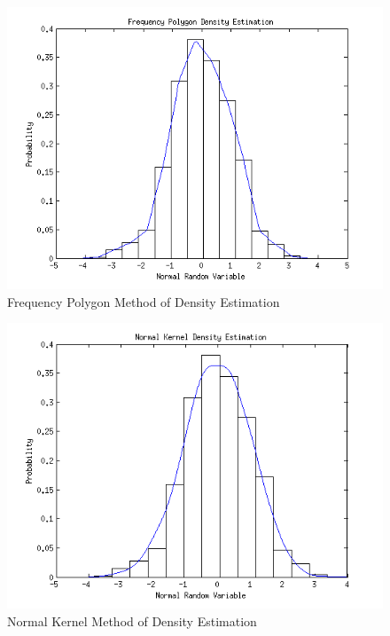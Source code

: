 \documentclass[12pt,a4paper]{article}
\begin{document}
\begin{figure}[ht!] 
\begin{center}
\includegraphics[scale=.86]{q9p4_graph2.png}
\caption{Frequency Polygon Method of Density Estimation}
\label{q4 fig2}
\end{center}
\end{figure}
\FloatBarrier

\begin{figure}[ht!] 
\begin{center}
\includegraphics[scale=.86]{q9p4_graph3.png}
\caption{Normal Kernel Method of Density Estimation}
\label{q4 fig3}
\end{center}
\end{figure}
\FloatBarrier
\end{document}
